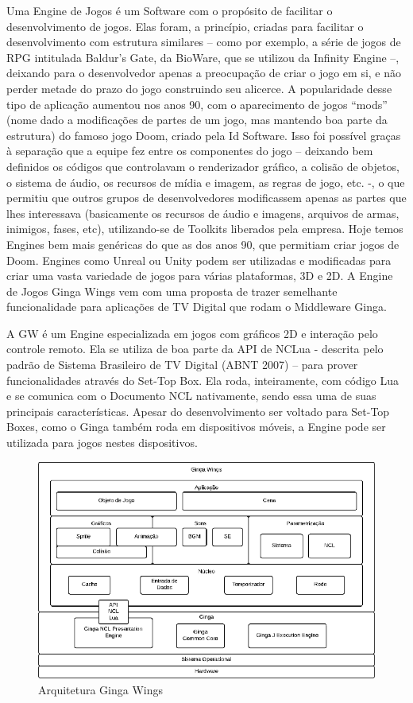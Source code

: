 \documentclass[
	12pt,				%
	openright,			%
	oneside,			%
	a4paper,			%
	brazil,				%
	]{abntex2}
\begin{document}
Uma Engine de Jogos é um Software com o propósito de facilitar o desenvolvimento de jogos. Elas foram, a princípio, criadas para facilitar o desenvolvimento com estrutura similares – como por exemplo, a série de jogos de RPG intitulada Baldur’s Gate, da BioWare, que se utilizou da Infinity Engine –, deixando para o desenvolvedor apenas a preocupação de criar o jogo em si, e não perder metade do prazo do jogo construindo seu alicerce. A popularidade desse tipo de aplicação aumentou nos anos 90, com o aparecimento de jogos “mods” (nome dado a modificações de partes de um jogo, mas mantendo boa parte da estrutura) do famoso jogo Doom, criado pela Id Software. Isso foi possível graças à separação que a equipe fez entre os componentes do jogo – deixando bem definidos os códigos que controlavam o renderizador gráfico, a colisão de objetos, o sistema de áudio, os recursos de mídia e imagem, as regras de jogo, etc. -, o que permitiu que outros grupos de desenvolvedores modificassem apenas as partes que lhes interessava (basicamente os recursos de áudio e imagens, arquivos de armas, inimigos, fases, etc), utilizando-se de Toolkits liberados pela empresa. Hoje temos Engines bem mais genéricas do que as dos anos 90, que permitiam criar jogos de Doom. Engines como Unreal ou Unity podem ser utilizadas e modificadas para criar uma vasta variedade de jogos para várias plataformas, 3D e 2D. A Engine de Jogos Ginga Wings vem com uma proposta de trazer semelhante funcionalidade para aplicações de TV Digital que rodam o Middleware Ginga.

A GW é um Engine especializada em jogos com gráficos 2D e interação pelo controle remoto. Ela se utiliza de boa parte da API de NCLua - descrita pelo padrão de Sistema Brasileiro de TV Digital (ABNT 2007) – para prover funcionalidades através do Set-Top Box. Ela roda, inteiramente, com código Lua e se comunica com o Documento NCL nativamente, sendo essa uma de suas principais características. Apesar do desenvolvimento ser voltado para Set-Top Boxes, como o Ginga também roda em dispositivos móveis, a Engine pode ser utilizada para jogos nestes dispositivos.

\begin{figure}
\centering
\includegraphics{arquitetura.png}
\caption{Arquitetura Ginga Wings}
\label{fig:arquiteturaGW}
\end{figure}
\end{document}
